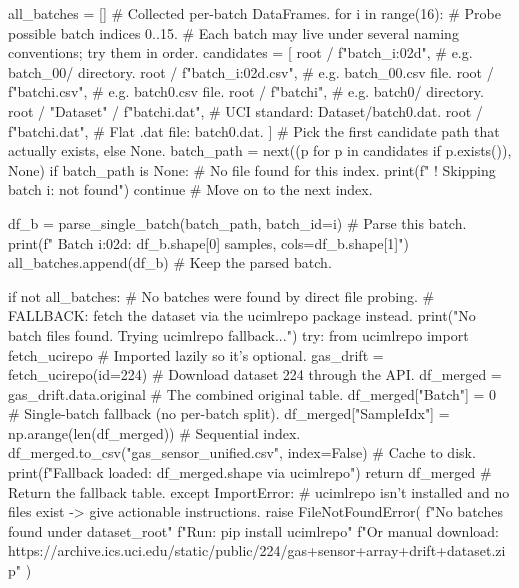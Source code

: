     all_batches = []                       # Collected per-batch DataFrames.
    for i in range(16):                    # Probe possible batch indices 0..15.
        # Each batch may live under several naming conventions; try them in order.
        candidates = [
            root / f"batch_{i:02d}",       # e.g. batch_00/ directory.
            root / f"batch_{i:02d}.csv",   # e.g. batch_00.csv file.
            root / f"batch{i}.csv",        # e.g. batch0.csv file.
            root / f"batch{i}",            # e.g. batch0/ directory.
            root / "Dataset" / f"batch{i}.dat",  # UCI standard: Dataset/batch0.dat.
            root / f"batch{i}.dat",        # Flat .dat file: batch0.dat.
        ]
        # Pick the first candidate path that actually exists, else None.
        batch_path = next((p for p in candidates if p.exists()), None)
        if batch_path is None:             # No file found for this index.
            print(f"  ! Skipping batch {i}: not found")
            continue                       # Move on to the next index.

        df_b = parse_single_batch(batch_path, batch_id=i)  # Parse this batch.
        print(f"  Batch {i:02d}: {df_b.shape[0]} samples, cols={df_b.shape[1]}")
        all_batches.append(df_b)           # Keep the parsed batch.

    if not all_batches:                    # No batches were found by direct file probing.
        # FALLBACK: fetch the dataset via the ucimlrepo package instead.
        print("No batch files found. Trying ucimlrepo fallback...")
        try:
            from ucimlrepo import fetch_ucirepo  # Imported lazily so it's optional.
            gas_drift = fetch_ucirepo(id=224)     # Download dataset 224 through the API.
            df_merged = gas_drift.data.original    # The combined original table.
            df_merged["Batch"] = 0                 # Single-batch fallback (no per-batch split).
            df_merged["SampleIdx"] = np.arange(len(df_merged))  # Sequential index.
            df_merged.to_csv("gas_sensor_unified.csv", index=False)  # Cache to disk.
            print(f"Fallback loaded: {df_merged.shape} via ucimlrepo")
            return df_merged               # Return the fallback table.
        except ImportError:
            # ucimlrepo isn't installed and no files exist -> give actionable instructions.
            raise FileNotFoundError(
                f"No batches found under {dataset_root}\n"
                f"Run: pip install ucimlrepo\n"
                f"Or manual download: https://archive.ics.uci.edu/static/public/224/gas+sensor+array+drift+dataset.zip"
            )

